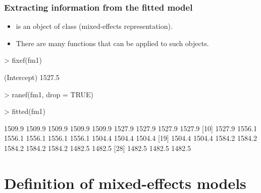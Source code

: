 \begin{frame}[fragile]
  \frametitle{Extracting information from the fitted model}
  \begin{itemize}
  \item {} is an object of class  (mixed-effects
    representation). 
  \item There are many  functions that can be applied
    to such objects.
  \end{itemize}
\begin{Schunk}
\begin{Sinput}
> fixef(fm1)
\end{Sinput}
\begin{Soutput}
(Intercept) 
     1527.5 
\end{Soutput}
\begin{Sinput}
> ranef(fm1, drop = TRUE)
\end{Sinput}
\begin{Sinput}
> fitted(fm1)
\end{Sinput}
\begin{Soutput}
 [1] 1509.9 1509.9 1509.9 1509.9 1509.9 1527.9 1527.9 1527.9 1527.9
[10] 1527.9 1556.1 1556.1 1556.1 1556.1 1556.1 1504.4 1504.4 1504.4
[19] 1504.4 1504.4 1584.2 1584.2 1584.2 1584.2 1584.2 1482.5 1482.5
[28] 1482.5 1482.5 1482.5
\end{Soutput}
\end{Schunk}
\end{frame}


\section[Mixed models]{Definition of mixed-effects models}

